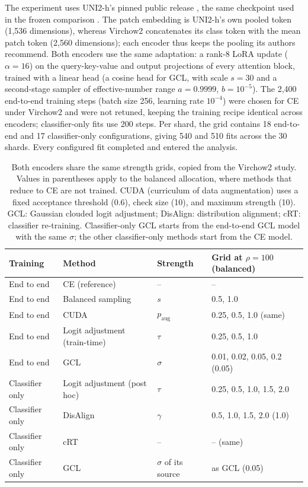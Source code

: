 \documentclass[11pt]{article}
\begin{document}
The experiment uses UNI2-h's pinned public release \citep{mahmoodlab2025uni2h}, the same checkpoint used in the frozen comparison \citep{queisler2026encoderTransfer}. The patch embedding is UNI2-h's own pooled token (1,536 dimensions), whereas Virchow2 concatenates its class token with the mean patch token (2,560 dimensions); each encoder thus keeps the pooling its authors recommend. Both encoders use the same adaptation: a rank-8 LoRA update ($\alpha=16$) on the query-key-value and output projections of every attention block, trained with a linear head (a cosine head for GCL, with scale $s=30$ and a second-stage sampler of effective-number range $a=0.9999$, $b=10^{-5}$). The 2,400 end-to-end training steps (batch size 256, learning rate $10^{-4}$) were chosen for CE under Virchow2 and were not retuned, keeping the training recipe identical across encoders; classifier-only fits use 200 steps. Per shard, the grid contains 18 end-to-end and 17 classifier-only configurations, giving 540 and 510 fits across the 30 shards. Every configured fit completed and entered the analysis.

\begin{table}[htbp]
\centering
\small
\renewcommand{\arraystretch}{1.15}
\begin{tabular}{@{}llll@{}}
\toprule
Training & Method & Strength & Grid at $\rho=100$ (balanced) \\
\midrule
End to end & CE (reference) & -- & -- \\
End to end & Balanced sampling & $s$ & 0.5, 1.0 \\
End to end & CUDA & $p_{\mathrm{aug}}$ & 0.25, 0.5, 1.0 (same) \\
End to end & Logit adjustment (train-time) & $\tau$ & 0.25, 0.5, 1.0 \\
End to end & GCL & $\sigma$ & 0.01, 0.02, 0.05, 0.2 (0.05) \\
Classifier only & Logit adjustment (post hoc) & $\tau$ & 0.25, 0.5, 1.0, 1.5, 2.0 \\
Classifier only & DisAlign & $\gamma$ & 0.5, 1.0, 1.5, 2.0 (1.0) \\
Classifier only & cRT & -- & -- (same) \\
Classifier only & GCL & $\sigma$ of its source & as GCL (0.05) \\
\bottomrule
\end{tabular}
\caption{Both encoders share the same strength grids, copied from the Virchow2 study. Values in parentheses apply to the balanced allocation, where methods that reduce to CE are not trained. CUDA (curriculum of data augmentation) uses a fixed acceptance threshold (0.6), check size (10), and maximum strength (10). GCL: Gaussian clouded logit adjustment; DisAlign: distribution alignment; cRT: classifier re-training. Classifier-only GCL starts from the end-to-end GCL model with the same $\sigma$; the other classifier-only methods start from the CE model.}
\label{tab:grid}
\end{table}
\end{document}
